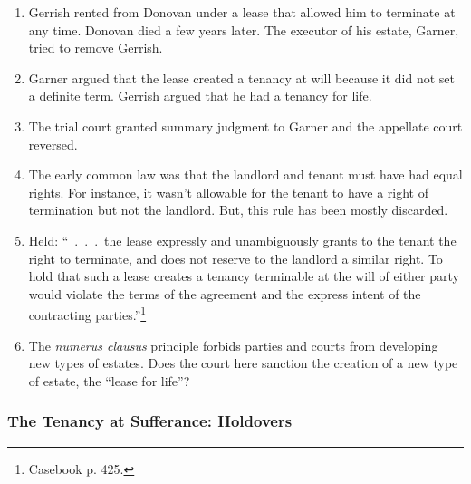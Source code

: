 \begin{enumerate}
    \item Gerrish rented from Donovan under a lease that allowed him to 
    terminate at any time. Donovan died a few years later. The executor of his 
    estate, Garner, tried to remove Gerrish.
    \item Garner argued that the lease created a tenancy at will because it 
    did not set a definite term. Gerrish argued that he had a tenancy for 
    life.
    \item The trial court granted summary judgment to Garner and the appellate 
    court reversed.
    \item The early common law was that the landlord and tenant must have had 
    equal rights. For instance, it wasn't allowable for the tenant to have a 
    right of termination but not the landlord. But, this rule has been mostly 
    discarded.
    \item Held: ``~.~.~.~the lease expressly and unambiguously grants to the 
    tenant the right to terminate, and does not reserve to the landlord a 
    similar right. To hold that such a lease creates a tenancy terminable at 
    the will of either party would violate the terms of the agreement and the 
    express intent of the contracting parties.''\footnote{Casebook p. 425.}
    \item The \emph{numerus clausus} principle forbids parties and courts from 
    developing new types of estates. Does the court here sanction the creation 
    of a new type of estate, the ``lease for life''?
\end{enumerate}

\subsubsection{The Tenancy at Sufferance: Holdovers}

